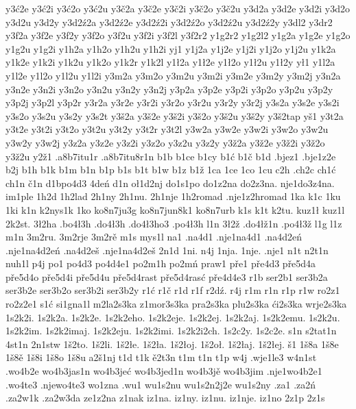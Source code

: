 {y3ć2e
y3ć2i
y3ć2o
y3ć2u
y3č2a
y3č2e
y3č2i
y3č2o
y3č2u
y3d2a
y3d2e
y3d2i
y3d2o
y3d2u
y3d2y
y3d2ź2a
y3d2ź2e
y3d2ź2i
y3d2ź2o
y3d2ź2u
y3d2ź2y
y3dl2
y3dr2
y3f2a
y3f2e
y3f2y
y3f2o
y3f2u
y3f2i
y3f2l
y3f2r2
y1g2r2
y1g2l2
y1g2a
y1g2e
y1g2o
y1g2u
y1g2i
y1h2a
y1h2o
y1h2u
y1h2i
yj1
y1j2a
y1j2e
y1j2i
y1j2o
y1j2u
y1k2a
y1k2e
y1k2i
y1k2u
y1k2o
y1k2r
y1k2l
y1ł2a
y1ł2e
y1ł2o
y1ł2u
y1ł2y
ył1
y1l2a
y1l2e
y1l2o
y1l2u
y1l2i
y3m2a
y3m2o
y3m2u
y3m2i
y3m2e
y3m2y
y3m2j
y3n2a
y3n2e
y3n2i
y3n2o
y3n2u
y3n2y
y3n2j
y3p2a
y3p2e
y3p2i
y3p2o
y3p2u
y3p2y
y3p2j
y3p2l
y3p2r
y3r2a
y3r2e
y3r2i
y3r2o
y3r2u
y3r2y
y3r2j
y3s2a
y3s2e
y3s2i
y3s2o
y3s2u
y3s2y
y3s2t
y3š2a
y3š2e
y3š2i
y3š2o
y3š2u
y3š2y
y3š2tap
yš1
y3t2a
y3t2e
y3t2i
y3t2o
y3t2u
y3t2y
y3t2r
y3t2l
y3w2a
y3w2e
y3w2i
y3w2o
y3w2u
y3w2y
y3w2j
y3z2a
y3z2e
y3z2i
y3z2o
y3z2u
y3z2y
y3ž2a
y3ž2e
y3ž2i
y3ž2o
y3ž2u
y2ž1                       
.a8b7itu1r
.a8b7itu8r1n
b1b
b1ce
b1cy
b1ć
b1č
b1d
.bjez1
.bje1z2e
b2j
b1h
b1k
b1m
b1n
b1p
b1s
b1t
b1w
b1z
b1ž
1ca
1ce
1co
1cu
c2h
.ch2c
ch1ć
ch1n
č1n
d1bpo4d3
4deń
d1n
oł1d2nj
do1s1po
do1z2na
do2z3na.
nje1do3z4na.
im1ple
1h2d
1h2lad
2h1ny
2h1nu.
2h1nje
1h2romad
.nje1z2hromad
1ka
k1c
1ku
1ki
k1n
k2nys1k
1ko
ko8n7ju3g
ko8n7jun8k1
ko8n7urb
k1s
k1t
k2tu.
kuz1ł
kuz1l
2k2st.
3ł2ha
.bo4ł3h
.do4ł3h
.do4ł3ho3
.po4ł3h
l1n
3ł2ž
.do4łž1n
.po4ł3ž
l1g
l1z
m1n
3m2ru.
3m2rje
3m2rě
m1s
mys1l
na1
.na4d1
.nje1na4d1
.na4d2eń
.nje1na4d2eń
.na4d2eš
.nje1na4d2eš
2n1d
1ni.
n4j
1nja.
1nje.
.nje1
n1t
n2t1n
nuh1l
p4j
po1
po4d3
po4d4e1
po2m1h
po2mń
praw1
pře1
pře4d3
pře5d4a
pře5d4o
pře5d4i
pře5d4u
pře5d4rast
pře5d4rasć
pře4d4e3
r1b
ser2b1
ser3b2a
ser3b2e
ser3b2o
ser3b2i
ser3b2y
r1ć
r1č
r1d
r1f
r2dź.
r4j
r1m
r1n
r1p
r1w
ro2z1
ro2z2e1
s1ć
si1gna1l
m2la2s3ka
z1mor3s3ka
pra2s3ka
plu2s3ka
ći2s3ka
wrje2s3ka
1s2k2i.
1s2k2a.
1s2k2e.
1s2k2eho.
1s2k2eje.
1s2k2ej.
1s2k2aj.
1s2k2emu.
1s2k2u.
1s2k2im.
1s2k2imaj.
1s2k2eju.
1s2k2imi.
1s2k2i2ch.
1s2c2y.
1s2c2e.
s1n
s2tat1n
4st1n
2n1stw
1š2to.
1š2li.
1š2łe.
1š2ła.
1š2łoj.
1š2oł.
1š2łaj.
1š2łej.
š1
1š8a
1š8e
1š8ě
1š8i
1š8o
1š8u
a2š1nj
t1d
t1k
ě2t3n
t1m
t1n
t1p
w4j
.wje1le3
w4n1st
.wo4b2e
wo4b3jas1n
wo4b3jeć
wo4b3jed1n
wo4b3jě
wo4b3jim
.nje1wo4b2e1
.wo4te3
.njewo4te3
wo1zna
.wu1
wu1s2nu
wu1s2n2j2e
wu1s2ny
.za1
.za2ń
.za2w1k
.za2w3da
ze1z2na
z1nak
iz1na.
iz1ny.
iz1nu.
iz1nje.
iz1no
2z1p
2z1s
}

